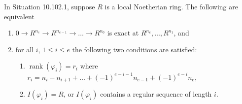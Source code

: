 \begin{proposition}[10.102.9, Tag 00N1]
In Situation 10.102.1, suppose $R$ is a local Noetherian ring. The following are equivalent
\begin{enumerate}
\item $0\to R^{n_e}\to R^{n_{e-1}}\to\ldots\to R^{n_0}$ is exact at $R^{n_e},\ldots,R^{n_1}$, and
\item for all $i$, $1\leq i\leq e$ the following two conditions are satisfied:
\begin{enumerate}[label=(\alph*)]
\item $\operatorname{rank}(\varphi_i)=r_i$ where $r_i=n_i-n_{i+1}+\ldots+(-1)^{e-i-1}n_{e-1}+(-1)^{e-i}n_e$,
\item $I(\varphi_i)=R$, or $I(\varphi_i)$ contains a regular sequence of length $i$.
\end{enumerate}
\end{enumerate}
\end{proposition}
